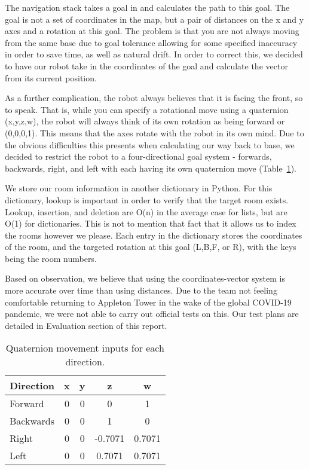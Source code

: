 \documentclass{article}
\begin{document}
The navigation stack takes a goal in and calculates the path to this goal. The goal is not a set of coordinates in the map, but a pair of distances on the x and y axes and a rotation at this goal. The problem is that you are not always moving from the same base due to goal tolerance allowing for some specified inaccuracy in order to save time, as well as natural drift. In order to correct this, we decided to have our robot take in the coordinates of the goal and calculate the vector from its current position.

As a further complication, the robot always believes that it is facing the front, so to speak. That is, while you can specify a rotational move using a quaternion (x,y,z,w), the robot will always think of its own rotation as being forward or (0,0,0,1). This means that the axes rotate with the robot in its own mind. Due to the obvious difficulties this presents when calculating our way back to base, we decided to restrict the robot to a four-directional goal system - forwards, backwards, right, and left with each having its own quaternion move (Table~\ref{tab:quaternions}).

We store our room information in another dictionary in Python. For this dictionary, lookup is important in order to verify that the target room exists. Lookup, insertion, and deletion are O(n) in the average case for lists, but are O(1) for dictionaries. This is not to mention that fact that it allows us to index the rooms however we please. Each entry in the dictionary stores the coordinates of the room, and the targeted rotation at this goal (L,B,F, or R), with the keys being the room numbers.

Based on observation, we believe that using the coordinates-vector system is more accurate over time than using distances. Due to the team not feeling comfortable returning to Appleton Tower in the wake of the global COVID-19 pandemic, we were not able to carry out official tests on this. Our test plans are detailed in Evaluation section of this report.

\begin{table}[h]
\vskip 3mm
\begin{center}
\begin{small}
\begin{sc}
\begin{tabular}{lcccc}
\hline
\abovespace\belowspace
Direction & x & y & z & w \\
\hline
  Forward & 0 & 0 & 0 & 1\\
  Backwards & 0 & 0 & 1 & 0 \\
  Right & 0 & 0 & -0.7071 & 0.7071 \\
  Left & 0 & 0 & 0.7071 & 0.7071 
\end{tabular}
\end{sc}
\end{small}
\caption{Quaternion movement inputs for each direction.}
\label{tab:quaternions}
\end{center}
\vskip -3mm
\end{table}
\end{document}

